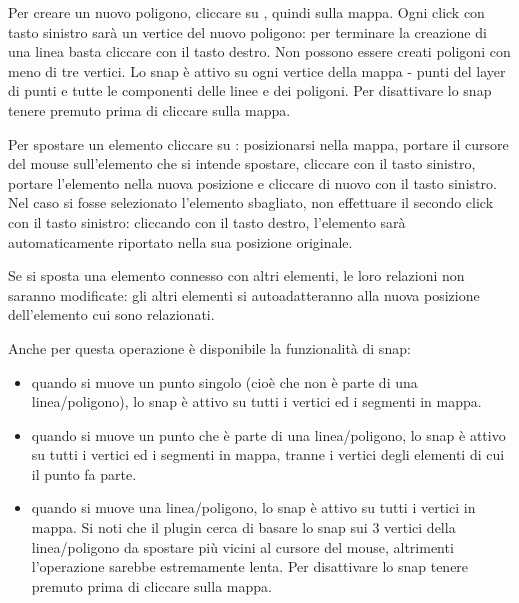 
Per creare un nuovo poligono, cliccare su , quindi sulla mappa.
Ogni click con tasto sinistro sarà un vertice del nuovo poligono: per terminare la 
creazione di una linea basta cliccare con il tasto destro.
Non possono essere creati poligoni con meno di tre vertici. 
Lo snap è attivo su ogni vertice della mappa - punti del layer di punti e tutte le componenti delle linee 
e dei poligoni. Per disattivare lo snap tenere premuto  prima di cliccare sulla 
mappa. 


Per spostare un elemento cliccare su : posizionarsi nella mappa, 
portare il cursore del mouse sull'elemento che si intende spostare, cliccare con il tasto sinistro, 
portare l'elemento nella nuova posizione e cliccare di nuovo con il tasto sinistro. 
Nel caso si fosse selezionato l'elemento sbagliato, non effettuare il secondo click con il tasto sinistro:
cliccando con il tasto destro, l'elemento sarà automaticamente riportato nella sua posizione originale.

Se si sposta una elemento connesso con altri elementi, le loro relazioni non saranno modificate: gli altri 
elementi si autoadatteranno alla nuova posizione dell'elemento cui sono relazionati.

Anche per questa operazione è disponibile la funzionalità di snap:

\begin{itemize}[label=--]
\item quando si muove un punto singolo (cioè che non è parte di una linea/poligono), lo snap è attivo su 
tutti i vertici ed i segmenti in mappa. 
\item quando si muove un punto che è parte di una linea/poligono, lo snap è attivo su 
tutti i vertici ed i segmenti in mappa, tranne i vertici degli elementi di cui il punto fa parte.
\item quando si muove una linea/poligono, lo snap è attivo su tutti i vertici in mappa.
Si noti che il plugin cerca di basare lo snap sui 3 vertici della linea/poligono da spostare più vicini 
al cursore del mouse, altrimenti l'operazione sarebbe estremamente lenta. 
Per disattivare lo snap tenere premuto  prima di cliccare sulla 
mappa. 
\end{itemize}



